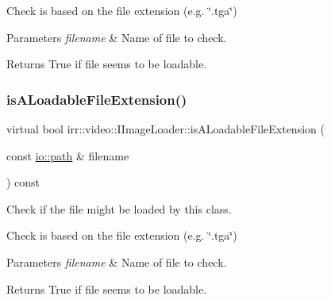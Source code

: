 Check is based on the file extension (e.\+g. \char`\"{}.\+tga\char`\"{}) 
\begin{DoxyParams}{Parameters}
{\em filename} & Name of file to check. \\
\hline
\end{DoxyParams}
\begin{DoxyReturn}{Returns}
True if file seems to be loadable. 
\end{DoxyReturn}
\mbox{\label{classirr_1_1video_1_1IImageLoader_a74f191446424017b8a71fea274bd0f0a}} 
\subsubsection{\texorpdfstring{is\+A\+Loadable\+File\+Extension()}{isALoadableFileExtension()}\hspace{0.1cm}{\footnotesize\ttfamily [2/2]}}
{\footnotesize\ttfamily virtual bool irr\+::video\+::\+I\+Image\+Loader\+::is\+A\+Loadable\+File\+Extension (\begin{DoxyParamCaption}\item[{const \hyperlink{namespaceirr_1_1io_a6468281622ce3a1c46b72e19f32dded5}{io\+::path} \&}]{filename }\end{DoxyParamCaption}) const\hspace{0.3cm}{\ttfamily [pure virtual]}}



Check if the file might be loaded by this class. 

Check is based on the file extension (e.\+g. \char`\"{}.\+tga\char`\"{}) 
\begin{DoxyParams}{Parameters}
{\em filename} & Name of file to check. \\
\hline
\end{DoxyParams}
\begin{DoxyReturn}{Returns}
True if file seems to be loadable. 
\end{DoxyReturn}
\mbox{\label{classirr_1_1video_1_1IImageLoader_aeb87ae825dfdb747e826b1e001a5f5cc}} 
